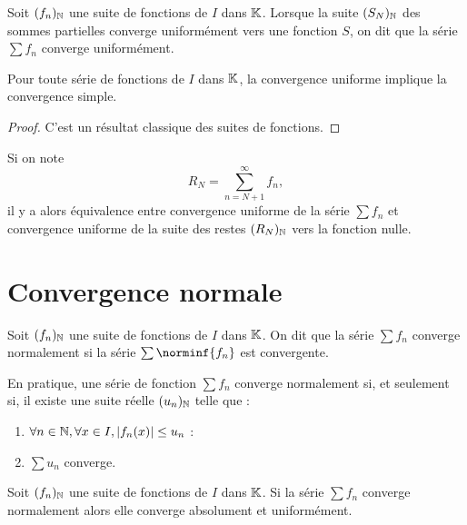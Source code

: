 \documentclass[french]{article}
\begin{document}
\begin{defn}
Soit $(f_n)_{\mathbb{N}}$ une suite de fonctions de $I$ dans $\mathbb{K}$.
Lorsque la suite $(S_N)_{\mathbb{N}}$ des sommes partielles converge uniformément vers une fonction $S$, 
on dit que la série $\sum f_n$ converge uniformément.
\end{defn}

\begin{thm}
Pour toute série de fonctions de $I$ dans $\mathbb{K}$, la convergence uniforme implique la convergence simple.
\end{thm}

\begin{proof}
C'est un résultat classique des suites de fonctions.
\end{proof}

\begin{rmq}
Si on note
\[ R_N = \sum_{n=N+1}^{\infty} f_n , \]
il y a alors équivalence entre convergence uniforme de la série $\sum f_n$ et convergence uniforme de la suite des restes $(R_N)_{\mathbb{N}}$ 
vers la fonction nulle.
\end{rmq}

\section{Convergence normale}

\begin{defn}
Soit $(f_n)_{\mathbb{N}}$ une suite de fonctions de $I$ dans $\mathbb{K}$.
On dit que la série $\sum f_n$ converge normalement si la série $\sum \norminf{f_n}$ est convergente.
\end{defn}

\begin{rmq}
En pratique, une série de fonction $\sum f_n$ converge normalement si, et seulement si, il existe une suite réelle $(u_n)_{\mathbb{N}}$ telle que :
\begin{enumerate}[label=(\roman*)]
\item $\forall n \in \mathbb{N}, \forall x \in I, \lvert f_n(x)\rvert \leq u_n$ :
\item $\sum u_n$ converge.
\end{enumerate}
\end{rmq}

\begin{thm}
Soit $(f_n)_{\mathbb{N}}$ une suite de fonctions de $I$ dans $\mathbb{K}$.
Si la série $\sum f_n$ converge normalement alors elle converge absolument et uniformément.
\end{thm}
\end{document}
